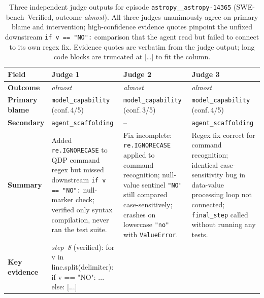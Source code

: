 \documentclass{article}
\begin{document}
\begin{table}[h]
\centering
\caption{%
  Three independent judge outputs for episode
  \texttt{astropy\_\_astropy-14365} (SWE-bench~Verified, outcome
  \emph{almost}).  All three judges unanimously agree on primary blame and
  intervention; high-confidence evidence quotes pinpoint the unfixed
  downstream \texttt{if\,v\,==\,"NO":} comparison that the agent read but
  failed to connect to its own regex fix.
  Evidence quotes are verbatim from the judge output; long code blocks are
  truncated at [\ldots] to fit the column.
}
\label{tab:judge-case-astropy}
\scriptsize
\setlength{\tabcolsep}{4pt}
\renewcommand{\arraystretch}{1.4}
\begin{tabularx}{\linewidth}{@{} >{\bfseries\RaggedRight}p{2.0cm}
                                  >{\RaggedRight\arraybackslash}X
                                  >{\RaggedRight\arraybackslash}X
                                  >{\RaggedRight\arraybackslash}X @{}}
\toprule
Field & Judge 1 & Judge 2 & Judge 3 \\
\midrule
\rowcolor{rowgray}
Outcome & \emph{almost} & \emph{almost} & \emph{almost} \\
Primary blame
  & \texttt{model\_capability} (conf.\,4/5)
  & \texttt{model\_capability} (conf.\,3/5)
  & \texttt{model\_capability} (conf.\,4/5) \\
\rowcolor{rowgray}
Secondary & \texttt{agent\_scaffolding} & -- & \texttt{agent\_scaffolding} \\
Summary
  & Added \texttt{re.IGNORECASE} to QDP command regex but missed downstream
    \texttt{if\,v\,==\,"NO":} null-marker check; verified only syntax
    compilation, never ran the test suite.
  & Fix incomplete: \texttt{re.IGNORECASE} applied to command recognition;
    null-value sentinel \texttt{"NO"} still compared case-sensitively;
    crashes on lowercase \texttt{"no"} with \texttt{ValueError}.
  & Regex fix correct for command recognition; identical case-sensitivity
    bug in data-value processing loop not connected; \texttt{final\_step}
    called without running any tests. \\
\rowcolor{rowgray}
Key evidence
  & \textit{step~8} (verified):\newline
    {\ttfamily for v in line.split(delimiter):\newline
    \phantom{xxxx}if v == "NO":\newline
    \phantom{xxxxxxxx}...\newline
    \phantom{xxxx}else: [...]}%
    \medskip\newline

\end{tabularx}
\end{table}
\end{document}

